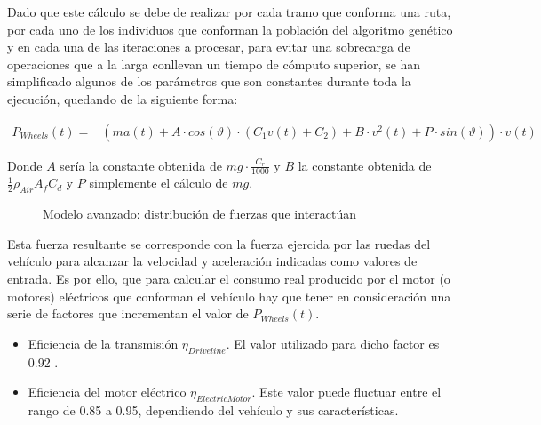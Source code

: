 \documentclass[11pt,spanish,listoffigures,listoftables]{tfgetsinf}
\begin{document}
\begin{itemize}
    Dado que este cálculo se debe de realizar por cada tramo que conforma una ruta, por cada uno de los individuos que conforman la población del algoritmo genético y en cada una de las iteraciones a procesar, para evitar una sobrecarga de operaciones que a la larga conllevan un tiempo de cómputo superior, se han simplificado algunos de los parámetros que son constantes durante toda la ejecución, quedando de la siguiente forma:
    
    \begin{align}
        P_{Wheels}(t) = & \left(ma(t) + A \cdot cos(\vartheta) \cdot (C_{1}v(t) + C_{2}) + B \cdot v^{2}(t) + P \cdot sin(\vartheta) \right) \cdot v(t)
    \end{align}
    
    Donde $A$ sería la constante obtenida de $mg \cdot \frac{C_{r}}{1000}$ y $B$ la constante obtenida de $\frac{1}{2}\rho_{Air}A_{f}C_{d}$ y $P$ simplemente el cálculo de $mg$.
    
    \begin{figure}[ht]
    \centering
    \caption{Modelo avanzado: distribución de fuerzas que interactúan}
    \end{figure}
    
    Esta fuerza resultante se corresponde con la fuerza ejercida por las ruedas del vehículo para alcanzar la velocidad y aceleración indicadas como valores de entrada. Es por ello, que para calcular el consumo real producido por el motor (o motores) eléctricos que conforman el vehículo hay que tener en consideración una serie de factores que incrementan el valor de $P_{Wheels}(t)$.
    \begin{itemize}
        \item Eficiencia de la transmisión $\eta_{Driveline}$. El valor utilizado para dicho factor es 0.92 \cite{RAKHA2011492}.
        \item Eficiencia del motor eléctrico $\eta_{Electric Motor}$. Este valor puede fluctuar entre el rango de 0.85 a 0.95, dependiendo del vehículo y sus características.
    \end{itemize}
    

\end{itemize}
\end{document}
